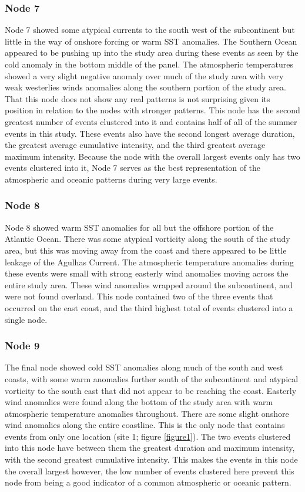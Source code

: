\documentclass[utf8]{frontiersSCNS}
\begin{document}
\subsubsection{Node 7}
Node 7 showed some atypical currents to the south west of the subcontinent but little in the way of onshore forcing or warm SST anomalies. The Southern Ocean appeared to be pushing up into the study area during these events as seen by the cold anomaly in the bottom middle of the panel. The atmospheric temperatures showed a very slight negative anomaly over much of the study area with very weak westerlies winds anomalies along the southern portion of the study area. That this node does not show any real patterns is not surprising given its position in relation to the nodes with stronger patterns. This node has the second greatest number of events clustered into it and contains half of all of the summer events in this study. These events also have the second longest average duration, the greatest average cumulative intensity, and the third greatest average maximum intensity. Because the node with the overall largest events only has two events clustered into it, Node 7 serves as the best representation of the atmospheric and oceanic patterns during very large events. 

\subsubsection{Node 8}
Node 8 showed warm SST anomalies for all but the offshore portion of the Atlantic Ocean. There was some atypical vorticity along the south of the study area, but this was moving away from the coast and there appeared to be little leakage of the Agulhas Current. The atmospheric temperature anomalies during these events were small with strong easterly wind anomalies moving across the entire study area. These wind anomalies wrapped around the subcontinent, and were not found overland. This node contained two of the three events that occurred on the east coast, and the third highest total of events clustered into a single node.

\subsubsection{Node 9}
The final node showed cold SST anomalies along much of the south and west coasts, with some warm anomalies further south of the subcontinent and atypical vorticity to the south east that did not appear to be reaching the coast. Easterly wind anomalies were found along the bottom of the study area with warm atmospheric temperature anomalies throughout. There are some slight onshore wind anomalies along the entire coastline. This is the only node that contains events from only one location (site 1; figure \ref{figure1}). The two events clustered into this node have between them the greatest duration and maximum intensity, with the second greatest cumulative intensity. This makes the events in this node the overall largest however, the low number of events clustered here prevent this node from being a good indicator of a common atmospheric or oceanic pattern.
\end{document}
